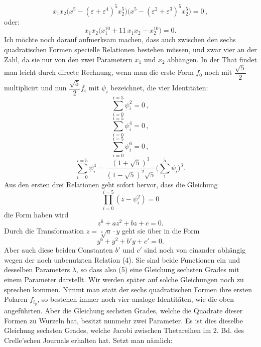 \documentclass[11pt]{article}
\providecommand{\gesperrt}[1]{\textls[130]{#1}}
\providecommand{\weberpage}[1]{}
\providecommand{\weq}[2]{\begin{equation}\tag{#1}#2\end{equation}}
\begin{document}
\weberpage{166}
\[
x_1x_2\big(x^5 - (\varepsilon+\varepsilon^4)^5 x_2^5\big)\big(x^5 - (\varepsilon^2+\varepsilon^3)^5 x_2^5\big) = 0\,, %
\]
oder:
\[
x_1x_2\big(x_1^{10} + 11\,x_1x_2 - x_2^{10}\big) = 0.
\]
Ich möchte noch darauf aufmerksam machen, dass auch zwischen den sechs quadratischen Formen specielle Relationen bestehen müssen, und zwar vier an der Zahl, da sie nur von den zwei Parametern $x_1$ und $x_2$ abhängen. In der That findet man leicht durch directe Rechnung, wenn man die erste Form $f_0$ noch mit $\dfrac{\sqrt5}{2}$ multiplicirt und nun $\dfrac{\sqrt5}{2}f_i$ mit $\psi_i$ bezeichnet, die vier Identitäten:
\weq{1}{\sum_{i=0}^{i=5}\psi_i^2 = 0\,,}
\weq{2}{\sum_{i=0}^{i=5}\psi_i^4 = 0\,,}
\weq{3}{\sum_{i=0}^{i=5}\psi_i^6 = 0\,,}
\weq{4}{\sum_{i=0}^{i=5}\psi_i^3 = \dfrac{(1+\sqrt5)^3}{(1-\sqrt5)^2\sqrt5}\Big(\sum_1^5 \psi_i\Big)^3.}
Aus den ersten drei Relationen geht sofort hervor, dass die Gleichung
\[
\prod_{i=0}^{i=5}(z-\psi_i^2) = 0
\]
die Form haben wird
\[
z^6 + az^2 + bz + c = 0.
\]
Durch die Transformation $z = \sqrt[4]{a}\cdot y$ geht sie über in die Form
\weq{5}{y^6 + y^2 + b'y + c' = 0.}
Aber auch diese beiden Constanten $b'$ und $c'$ sind noch von einander abhängig wegen der noch unbenutzten Relation (4). Sie sind beide Functionen ein und desselben Parameters $\lambda$, so dass also (5) eine Gleichung sechsten Grades mit einem \gesperrt{einzigen} Parameter darstellt. Wir werden später auf solche Gleichungen noch zu sprechen kommen. Nimmt man statt der sechs quadratischen Formen ihre ersten Polaren $f_{i_y}$, so bestehen immer noch vier analoge Identitäten, wie die oben angeführten. Aber die Gleichung sechsten Grades, welche die Quadrate dieser Formen zu Wurzeln hat, besitzt nunmehr zwei Parameter. Es ist dies dieselbe Gleichung sechsten Grades, welche Jacobi zwischen Thetareihen im 2. Bd. des Crelle'schen Journals erhalten hat. Setzt man nämlich:
\end{document}
